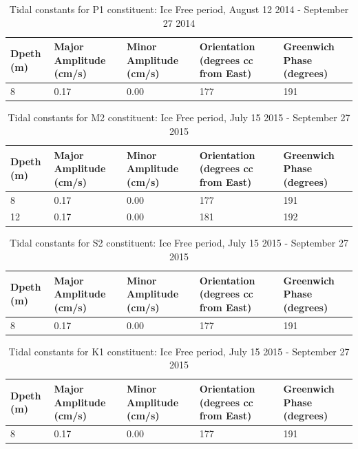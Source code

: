 \documentclass[12pt]{dforeport}
\begin{document}
\begin{table}[ht]
\centering
\caption[Tidal Constituents, P1, Ice Free, 2014]{Tidal constants for P1 constituent: Ice Free period, August 12 2014 - September 27 2014} 
\label{t:p1_if_2014}
\begin{tabular}{p{0.3in}p{.7in}p{.7in}p{.7in}p{.7in}}
 Dpeth (m) & Major Amplitude (cm/s) & Minor Amplitude (cm/s) & Orientation (degrees cc from East) & Greenwich Phase (degrees) \\ 
  \hline
8 & 0.17 & 0.00 & 177 & 191 \\
   \hline
\end{tabular}
\end{table}


\clearpage

\begin{table}[ht]
\centering
\caption[Tidal Constituents, M2, Ice Free, 2015]{Tidal constants for M2 constituent: Ice Free period, July 15 2015 - September 27 2015} 
\label{t:m2_if_2015}
\begin{tabular}{p{0.3in}p{.7in}p{.7in}p{.7in}p{.7in}}
 Dpeth (m) & Major Amplitude (cm/s) & Minor Amplitude (cm/s) & Orientation (degrees cc from East) & Greenwich Phase (degrees) \\ 
  \hline
8 & 0.17 & 0.00 & 177 & 191 \\
12 & 0.17 & 0.00 & 181 & 192 \\
   \hline
\end{tabular}
\end{table}

\begin{table}[ht]
\centering
\caption[Tidal Constituents, S2, Ice Free, 2015]{Tidal constants for S2 constituent: Ice Free period, July 15 2015 - September 27 2015} 
\label{t:s2_if_2015}
\begin{tabular}{p{0.3in}p{.7in}p{.7in}p{.7in}p{.7in}}
 Dpeth (m) & Major Amplitude (cm/s) & Minor Amplitude (cm/s) & Orientation (degrees cc from East) & Greenwich Phase (degrees) \\ 
  \hline
8 & 0.17 & 0.00 & 177 & 191 \\
   \hline
\end{tabular}
\end{table}

\begin{table}[ht]
\centering
\caption[Tidal Constituents, K1, Ice Free, 2015]{Tidal constants for K1 constituent: Ice Free period, July 15 2015 - September 27 2015} 
\label{t:k1_if_2015}
\begin{tabular}{p{0.3in}p{.7in}p{.7in}p{.7in}p{.7in}}
 Dpeth (m) & Major Amplitude (cm/s) & Minor Amplitude (cm/s) & Orientation (degrees cc from East) & Greenwich Phase (degrees) \\ 
  \hline
8 & 0.17 & 0.00 & 177 & 191 \\
   \hline
\end{tabular}
\end{table}
\end{document}
